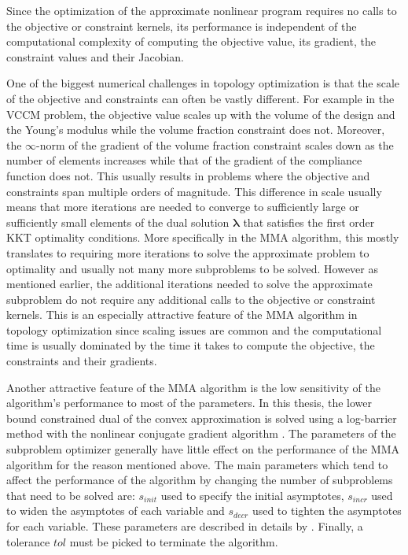   Since the optimization of the approximate nonlinear program requires no calls to the objective or constraint kernels, its performance is independent of the computational complexity of computing the objective value, its gradient, the constraint values and their Jacobian.
  
  One of the biggest numerical challenges in topology optimization is that the scale of the objective and constraints can often be vastly different. For example in the VCCM problem, the objective value scales up with the volume of the design and the Young's modulus while the volume fraction constraint does not. Moreover, the $\infty$-norm of the gradient of the volume fraction constraint scales down as the number of elements increases while that of the gradient of the compliance function does not. This usually results in problems where the objective and constraints span multiple orders of magnitude. This difference in scale usually means that more iterations are needed to converge to sufficiently large or sufficiently small elements of the dual solution $\bm{\lambda}$ that satisfies the first order KKT optimality conditions. More specifically in the MMA algorithm, this mostly translates to requiring more iterations to solve the approximate problem to optimality and usually not many more subproblems to be solved. However as mentioned earlier, the additional iterations needed to solve the approximate subproblem do not require any additional calls to the objective or constraint kernels. This is an especially attractive feature of the MMA algorithm in topology optimization since scaling issues are common and the computational time is usually dominated by the time it takes to compute the objective, the constraints and their gradients.

  Another attractive feature of the MMA algorithm is the low sensitivity of the algorithm's performance to most of the parameters. In this thesis, the lower bound constrained dual of the convex approximation is solved using a log-barrier method with the nonlinear conjugate gradient algorithm \citep{Nocedal2006}. The parameters of the subproblem optimizer generally have little effect on the performance of the MMA algorithm for the reason mentioned above. The main parameters which tend to affect the performance of the algorithm by changing the number of subproblems that need to be solved are: $s_{init}$ used to specify the initial asymptotes, $s_{incr}$ used to widen the asymptotes of each variable and $s_{decr}$ used to tighten the asymptotes for each variable. These parameters are described in details by \cite{Svanberg1987}. Finally, a tolerance $tol$ must be picked to terminate the algorithm.


